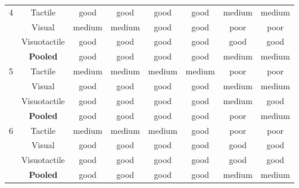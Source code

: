 \begin{longtable}{lccccccc}
4 & Tactile & \cellcolor{green!15}good & \cellcolor{green!15}good & \cellcolor{green!15}good & \cellcolor{green!15}good & \cellcolor{yellow!25}medium & \cellcolor{yellow!25}medium \\
 & Visual & \cellcolor{yellow!25}medium & \cellcolor{yellow!25}medium & \cellcolor{green!15}good & \cellcolor{green!15}good & \cellcolor{red!15}poor & \cellcolor{red!15}poor \\
 & Visuotactile & \cellcolor{green!15}good & \cellcolor{green!15}good & \cellcolor{green!15}good & \cellcolor{green!15}good & \cellcolor{green!15}good & \cellcolor{green!15}good \\
\textbf{} & \textbf{Pooled} & \cellcolor{green!15}good & \cellcolor{green!15}good & \cellcolor{green!15}good & \cellcolor{green!15}good & \cellcolor{yellow!25}medium & \cellcolor{yellow!25}medium \\
5 & Tactile & \cellcolor{yellow!25}medium & \cellcolor{yellow!25}medium & \cellcolor{yellow!25}medium & \cellcolor{yellow!25}medium & \cellcolor{red!15}poor & \cellcolor{red!15}poor \\
 & Visual & \cellcolor{green!15}good & \cellcolor{green!15}good & \cellcolor{green!15}good & \cellcolor{green!15}good & \cellcolor{yellow!25}medium & \cellcolor{yellow!25}medium \\
 & Visuotactile & \cellcolor{green!15}good & \cellcolor{green!15}good & \cellcolor{green!15}good & \cellcolor{green!15}good & \cellcolor{yellow!25}medium & \cellcolor{green!15}good \\
\textbf{} & \textbf{Pooled} & \cellcolor{green!15}good & \cellcolor{green!15}good & \cellcolor{green!15}good & \cellcolor{green!15}good & \cellcolor{red!15}poor & \cellcolor{yellow!25}medium \\
6 & Tactile & \cellcolor{yellow!25}medium & \cellcolor{yellow!25}medium & \cellcolor{yellow!25}medium & \cellcolor{green!15}good & \cellcolor{red!15}poor & \cellcolor{red!15}poor \\
 & Visual & \cellcolor{green!15}good & \cellcolor{green!15}good & \cellcolor{green!15}good & \cellcolor{green!15}good & \cellcolor{green!15}good & \cellcolor{green!15}good \\
 & Visuotactile & \cellcolor{green!15}good & \cellcolor{green!15}good & \cellcolor{green!15}good & \cellcolor{green!15}good & \cellcolor{green!15}good & \cellcolor{green!15}good \\
\textbf{} & \textbf{Pooled} & \cellcolor{green!15}good & \cellcolor{green!15}good & \cellcolor{green!15}good & \cellcolor{green!15}good & \cellcolor{yellow!25}medium & \cellcolor{yellow!25}medium \\

\end{longtable}
